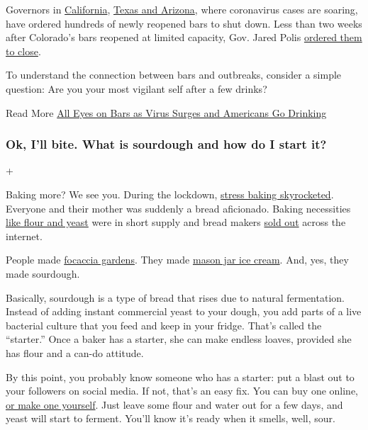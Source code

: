 Governors in
\href{https://www.nytimes.com/2020/07/01/us/california-coronavirus-reopening.html}{California},
\href{https://www.nytimes.com/2020/06/14/us/coronavirus-united-states.html}{Texas
and Arizona}, where coronavirus cases are soaring, have ordered hundreds
of newly reopened bars to shut down. Less than two weeks after
Colorado's bars reopened at limited capacity, Gov. Jared Polis
\href{https://www.denverpost.com/2020/06/30/colorado-bars-closed-coronavirus/}{ordered
them to close}.

To understand the connection between bars and outbreaks, consider a
simple question: Are you your most vigilant self after a few drinks?

 Read More
\href{https://www.nytimes.com/2020/07/02/us/coronavirus-bars.html}{All
Eyes on Bars as Virus Surges and Americans Go Drinking}

\hypertarget{ok-ill-bite-what-is-sourdough-and-how-do-i-start-it}{%
\subsubsection{Ok, I'll bite. What is sourdough and how do I start
it?}\label{ok-ill-bite-what-is-sourdough-and-how-do-i-start-it}}

+

Baking more? We see you. During the lockdown,
\href{https://www.nytimes.com/2020/03/30/style/bread-baking-coronavirus.html}{stress
baking skyrocketed}. Everyone and their mother was suddenly a bread
aficionado. Baking necessities
\href{https://www.washingtonpost.com/news/voraciously/wp/2020/03/24/people-are-baking-bread-like-crazy-and-now-were-running-out-of-flour-and-yeast/}{like
flour and yeast} were in short supply and bread makers
\href{https://people.com/food/bread-makers-viral-amazon/}{sold out}
across the internet.

People made
\href{https://www.nytimes.com/2020/04/24/dining/focaccia-bread.html}{focaccia
gardens}. They made
\href{https://www.nytimes.com/2020/05/09/at-home/virus-make-ice-cream-in-a-mason-jar.html}{mason
jar ice cream}. And, yes, they made sourdough.

Basically, sourdough is a type of bread that rises due to natural
fermentation. Instead of adding instant commercial yeast to your dough,
you add parts of a live bacterial culture that you feed and keep in your
fridge. That's called the ``starter.'' Once a baker has a starter, she
can make endless loaves, provided she has flour and a can-do attitude.

By this point, you probably know someone who has a starter: put a blast
out to your followers on social media. If not, that's an easy fix. You
can buy one online,
\href{https://www.kingarthurflour.com/recipes/sourdough-starter-recipe}{or
make one yourself}. Just leave some flour and water out for a few days,
and yeast will start to ferment. You'll know it's ready when it smells,
well, sour.

